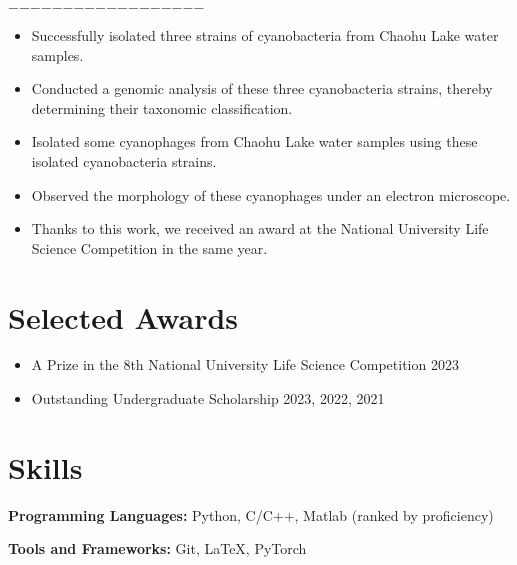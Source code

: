 \documentclass{resume}
\begin{document}
    \noindent\hfil$-$\hfil$-$\hfil$-$\hfil$-$\hfil$-$\hfil$-$\hfil$-$\hfil$-$\hfil$-$\hfil$-$\hfil$-$\hfil$-$\hfil$-$\hfil$-$\hfil$-$\hfil$-$\hfil$-$\hfil$-$\hfil
    \begin{itemize}
      \item Successfully isolated three strains of cyanobacteria from Chaohu Lake water samples.
      \item Conducted a genomic analysis of these three cyanobacteria strains, thereby determining their taxonomic classification.
      \item Isolated some cyanophages from Chaohu Lake water samples using these isolated cyanobacteria strains.
      \item Observed the morphology of these cyanophages under an electron microscope.
      \item Thanks to this work, we received an award at the National University Life Science Competition in the same year.
    \end{itemize}

\section{Selected Awards}
  \begin{itemize}
      \item A Prize in the 8th National University Life Science Competition \hfill 2023
      \item Outstanding Undergraduate Scholarship  \hfill 2023, 2022, 2021
  \end{itemize}


\section{Skills}
  \textbf{Programming Languages:} \small Python, C/C++, Matlab (ranked by proficiency)

  \textbf{Tools and Frameworks:} \small Git, \LaTeX, PyTorch
\end{document}
